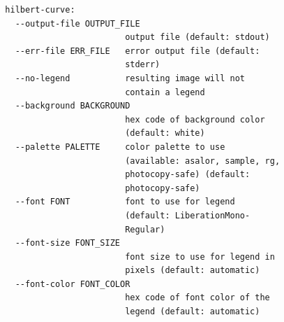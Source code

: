 \documentclass[
  digital, %
  color,   %
  oneside, %
  lof,     %
  nolot,     %
]{fithesis4}
\begin{document}
\begin{verbatim}
  hilbert-curve:
    --output-file OUTPUT_FILE
                          output file (default: stdout)
    --err-file ERR_FILE   error output file (default:
                          stderr)
    --no-legend           resulting image will not
                          contain a legend
    --background BACKGROUND
                          hex code of background color
                          (default: white)
    --palette PALETTE     color palette to use
                          (available: asalor, sample, rg,
                          photocopy-safe) (default:
                          photocopy-safe)
    --font FONT           font to use for legend
                          (default: LiberationMono-
                          Regular)
    --font-size FONT_SIZE
                          font size to use for legend in
                          pixels (default: automatic)
    --font-color FONT_COLOR
                          hex code of font color of the
                          legend (default: automatic)
\end{verbatim}
\end{document}
